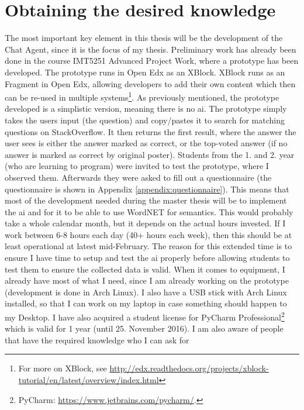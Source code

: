 \section{Obtaining the desired knowledge}
\label{chapter5:desired_knowledge}
The most important key element in this thesis will be the development of the Chat Agent, since it is the focus of my thesis. Preliminary work has already been done in the course 
IMT5251 Advanced Project Work, where a prototype has been developed. The prototype runs in Open Edx as an XBlock. XBlock runs as an Fragment in Open Edx, allowing developers to 
add their own content which then can be re-used in multiple systems\footnote{For more on XBlock, see 
	 \url{http://edx.readthedocs.org/projects/xblock-tutorial/en/latest/overview/index.html}}. As previously mentioned, the prototype developed is a simplistic version, meaning 
there is no \gls{ai}. The prototype simply takes the users input (the question) and copy/pastes it to search for matching questions on StackOverflow. It then returns the first 
result, where the answer the user sees is either the answer marked as correct, or the top-voted answer (if no answer is marked as correct by original poster). Students from the 
1. and 2. year (who are learning to program) were invited to test the prototype, where I observed them. Afterwards they were asked to fill out a questionnaire (the questionnaire 
is shown in Appendix \ref{appendix:questionnaire}).
\vspace{0.5em}\newline
This means that most of the development needed during the master thesis will be to implement the \gls{ai} and for it to be able to use WordNET for semantics. This would probably take 
a whole calendar month, but it depends on the actual hours invested. If I work between 6-8 hours each day (40+ hours each week), then this should be at least operational at latest 
mid-February. The reason for this extended time is to ensure I have time to setup and test the \gls{ai} properly before allowing students to test them to ensure the collected data is 
valid. When it comes to equipment, I already have most of what I need, since I am already working on the prototype (development is done in Arch Linux). I also have a USB stick 
with Arch Linux installed, so that I can work on my laptop in case something should happen to my Desktop. I have also acquired a student license for PyCharm Professional\footnote{
PyCharm: \url{https://www.jetbrains.com/pycharm/}.} which is valid for 1 year (until 25. November 2016). I am also aware of people that have the required knowledge who I can ask for 
